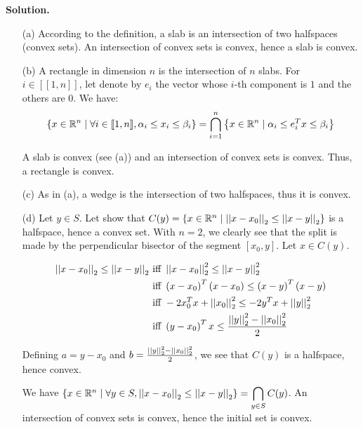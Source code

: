 \documentclass[a4paper, 11pt]{report}
\begin{document}
\noindent \textbf{Solution.}

\begin{itemize}
    \item[(a)] According to the definition, a slab is an intersection of two halfspaces (convex sets). An intersection of convex sets is convex, hence a slab is convex.
    
    \item[(b)] A rectangle in dimension $n$ is the intersection of $n$ slabs. For $i \in [\![ 1, n  ]\!]$, let denote by $e_{i}$ the vector whose $i$-th component is $1$ and the others are $0$. We have:
    \[ \left\{ x \in \mathbb{R}^{n} \mid \forall i \in [\![ 1, n ]\!], \alpha_{i} \leq x_{i} \leq \beta_{i}\right\} = \bigcap_{i=1}^{n} \left\{ x \in \mathbb{R}^{n} \mid \alpha_{i} \leq e_{i}^{T}x \leq \beta_{i}\right\} \]
    
    A slab is convex (see (a)) and an intersection of convex sets is convex. Thus, a rectangle is convex.
    
    \item[(c)] As in (a), a wedge is the intersection of two halfspaces, thus it is convex.
    
    \item[(d)] Let $y \in S$. Let show that $C(y) = \left\{ x \in \mathbb{R}^{n} \mid \left|\left| x - x_{0} \right|\right|_{2} \leq \left|\left| x - y \right|\right|_{2}\right\}$ is a halfspace, hence a convex set. With $n = 2$, we clearly see that the split is made by the perpendicular bisector of the segment $[x_{0}, y]$. Let $x \in C(y)$.
    
    \begin{equation*}
        \begin{split}
            \left|\left| x - x_{0} \right|\right|_{2} \leq \left|\left| x - y \right|\right|_{2} &\text{ iff } \left|\left| x - x_{0} \right|\right|_{2}^{2} \leq \left|\left| x - y \right|\right|_{2}^{2} \\
            &\text{ iff } \left( x - x_{0} \right)^{T} \left( x - x_{0} \right) \leq \left( x - y \right)^{T} \left( x - y \right) \\
            &\text{ iff } - 2 x_{0}^{T}x + \left|\left| x_{0} \right|\right|_{2}^{2} \leq - 2 y^{T}x + \left|\left| y \right|\right|_{2}^{2} \\
            &\text{ iff } \left( y - x_{0} \right)^{T}x \leq \frac{\left|\left| y \right|\right|_{2}^{2} - \left|\left| x_{0} \right|\right|_{2}^{2}}{2}
        \end{split}
    \end{equation*}


Defining $a = y - x_{0}$ and $b = \frac{\left|\left| y \right|\right|_{2}^{2} - \left|\left| x_{0} \right|\right|_{2}^{2}}{2}$, we see that $C(y)$ is a halfspace, hence convex.

We have $\left\{ x \in \mathbb{R}^{n} \mid \forall y \in S, \left|\left| x - x_{0} \right|\right|_{2} \leq \left|\left| x - y \right|\right|_{2}\right\} = \displaystyle\bigcap_{y \in S} C(y)$. An intersection of convex sets is convex, hence the initial set is convex.


\end{itemize}
\end{document}
